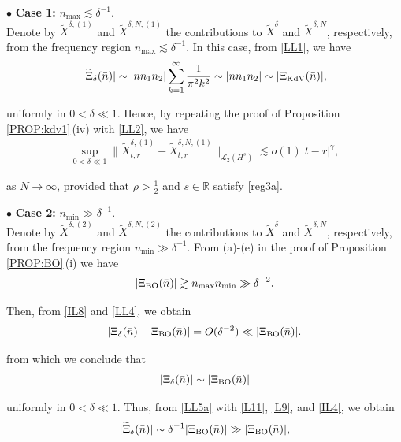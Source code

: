 \documentclass[letterpaper, 11pt,  reqno]{amsart}
\newcommand{\1}{\hspace{0.5mm}\text{I}\hspace{0.5mm}}
\newcommand{\noi}{\noindent}
\newcommand{\R}{\mathbb{R}}
\newcommand{\bul}{\bullet}
\newcommand{\dl}{\delta}
\newcommand{\g}{\gamma}
\newcommand{\wt}{\widetilde}
\newcommand{\les}{\lesssim}
\newcommand{\ges}{\gtrsim}
\newcommand{\cL}{\mathcal{L}}
\newcommand{\BO}{\text{\rm BO} }
\newcommand{\KDV}{\text{\rm KdV} }
\numberwithin{equation}{section}
\numberwithin{theorem}{section}
\begin{document}
\noi
$\bul$ {\bf Case 1:} $n_{\max} \les \dl^{-1}$.\\
\indent
Denote by 
 $\wt X^{\dl, (1)}$ and $ \wt X^{\dl,N, (1)}$
the contributions to 
$\wt X^\dl$ and $\wt X^{\dl,N}$, respectively, 
from the frequency region $n_{\max} \les \dl^{-1}$. 
In this case, from \eqref{LL1}, we have
\begin{align}
|\wt \Xi_\dl(\bar n)|
\sim  |n n_1 n_2|
 \sum_{k=1}^{\infty}   
 \frac1{\pi^2 k^2}
\sim  |n n_1 n_2|
\sim |\Xi_\KDV(\bar n)|, 
\label{LL2}
\end{align}

\noi
uniformly in $0 < \dl \ll 1$.
Hence, by repeating the proof of Proposition 
\ref{PROP:kdv1}\,(iv) with \eqref{LL2}, we have 
\begin{align}
\sup_{0 < \dl \ll 1} \|  \wt X^{\dl, (1)}_{t,r} - \wt X^{\dl,N, (1)}_{t,r} \|_{\cL_2 (H^s)}
\les
 o(1) |t-r|^\g, 
\label{LL3}
\end{align}


\noi
as $N \to \infty$, 
provided that 
 $\rho > \frac 12$ and $s \in \R$
satisfy 
\eqref{reg3a}.




\medskip

\noi
$\bul$ {\bf Case 2:} $ n_{\min} \gg \dl^{-1}$.\\
\indent
Denote by 
 $\wt X^{\dl, (2)}$ and $ \wt X^{\dl,N, (2)}$
the contributions to 
$\wt X^\dl$ and $\wt X^{\dl,N}$, respectively, 
from the frequency region 
$ n_{\min} \gg \dl^{-1}$.
 From (a)-(e) in the proof of Proposition \ref{PROP:BO}\,(i)
 we have
\begin{align}
|\Xi_\BO(\bar n)|\ges n_{\max}n_{\min} \gg \dl^{-2}.
\label{LL4}
\end{align}

\noi
Then, 
from 
  \eqref{IL8} and  \eqref{LL4}, 
we obtain
\begin{align*}
|\Xi_\dl(\bar n) - \Xi_\BO(\bar n)| = O(\dl^{-2}) \ll 
 |\Xi_\BO(\bar n)|.
\end{align*}


\noi
from which we conclude that 
\begin{align}
|\Xi_\dl(\bar n)|\sim | \Xi_\BO(\bar n)|
\label{LL5a}
\end{align}

\noi
uniformly in $0 < \dl \ll 1$.
Thus, from 
\eqref{LL5a} with 
\eqref{L11},  \eqref{L9}, 
and  \eqref{IL4},
we obtain
\begin{align}
|\wt \Xi_\dl(\bar n)|\sim \dl^{-1} | \Xi_\BO(\bar n)|
\gg  | \Xi_\BO(\bar n)|, 
\label{LL5}
\end{align}
\end{document}
